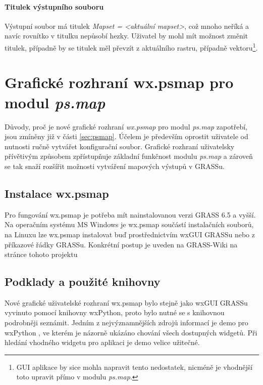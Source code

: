 \documentclass[a4paper,12pt,draft]{article}
\newcommand{\modul}[1]{\emph{#1}}
\begin{document}
\paragraph*{Titulek výstupního souboru}
Výstupní soubor má titulek \emph{Mapset = \textless aktuální mapset\textgreater}, což mnoho neříká a navíc rovnítko v titulku nepůsobí hezky. Uživatel by mohl mít možnost změnit titulek, případně by se titulek měl převzít z aktuálního rastru, případně vektoru\footnote{GUI aplikace by sice mohla napravit tento nedostatek, nicméně je vhodnější toto upravit přímo v modulu \modul{ps.map}.}.



\section{Grafické rozhraní  wx.psmap pro modul \modul{ps.map}}
\label{sec:gui}

Důvody, proč je nové grafické rozhraní \emph{wx.psmap} pro modul \modul{ps.map} zapotřebí, jsou zmíněny již v části \ref{sec:psmap}. Účelem je především oprostit uživatele od nutnosti ručně vytvářet konfigurační soubor. Grafické rozhraní uživatelsky přívětivým způsobem zpřístupňuje základní funkčnost modulu \modul{ps.map} a zároveň se tak snaží rozšířit možnosti vytváření mapových výstupů v GRASSu.

\subsection{Instalace wx.psmap}
Pro fungování wx.psmap je potřeba mít nainstalovanou verzi GRASS 6.5 a vyšší. Na operačním systému MS Windows je wx.psmap součástí instalačních souborů, na Linuxu lze wx.psmap instalovat buď prostřednictvím wxGUI GRASSu nebo z příkazové řádky GRASSu. Konkrétní postup je uveden na GRASS-Wiki na stránce tohoto projektu \cite{wiki_wxpsmap} 
\subsection{Podklady a použité knihovny}
Nové grafické uživatelské rozhraní wx.psmap bylo stejně jako wxGUI GRASSu vyvinuto pomocí knihovny wxPython, 
proto bylo nutné se s knihovnou podrobněji seznámit. Jedním z nejvýznamnějších zdrojů informací je demo pro wxPython \cite{demo}, ve kterém je názorně ukázáno chování všech dostupných widgetů. Při hledání vhodného widgetu pro aplikaci je demo velice užitečné. 
\end{document}
